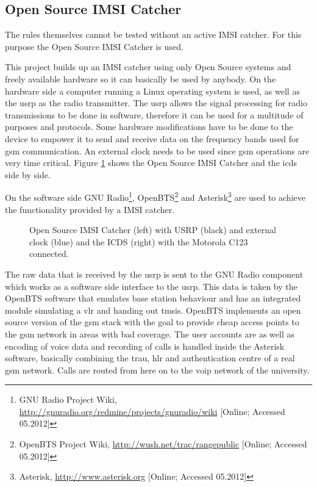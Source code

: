 \subsection{Open Source IMSI Catcher}
The rules themselves cannot be tested without an active IMSI catcher.
For this purpose the Open Source IMSI Catcher \cite{dennis} is used.

This project builds up an IMSI catcher using only Open Source systems and freely available hardware so it can basically be used by anybody.
On the hardware side a computer running a Linux operating system is used, as well as the \gls{usrp} as the radio transmitter.
The \gls{usrp} allows the signal processing for radio transmissions to be done in software, therefore it can be used for a multitude of purposes and protocols.
Some hardware modifications have to be done to the device to empower it to send and receive data on the frequency bands used for \gls{gsm} communication.
An external clock needs to be used since \gls{gsm} operations are very time critical.
Figure \ref{fig:setup} shows the Open Source IMSI Catcher and the \gls{icds} side by side.

On the software side GNU Radio\footnote{GNU Radio Project Wiki, \url{http://gnuradio.org/redmine/projects/gnuradio/wiki} [Online; Accessed 05.2012]}, OpenBTS\footnote{OpenBTS Project Wiki, \url{http://wush.net/trac/rangepublic} [Online; Accessed 05.2012]} and Asterisk\footnote{Asterisk, \url{http://www.asterisk.org} [Online; Accessed 05.2012]} are used to achieve the functionality provided by a IMSI catcher.
\begin{figure}
\caption{Open Source IMSI Catcher (left) with USRP (black) and external clock (blue) and the ICDS (right) with the Motorola C123 connected.}
\label{fig:setup}
\end{figure}
The raw data that is received by the \gls{usrp} is sent to the GNU Radio component which works as a software side interface to the \gls{usrp}.
This data is taken by the OpenBTS software that emulates base station behaviour and has an integrated module simulating a \gls{vlr} and handing out \glspl{tmsi}.
OpenBTS implements an open source version of the \gls{gsm} stack with the goal to provide cheap access points to the \gls{gsm} network in areas with bad coverage.
The user accounts are as well as encoding of voice data and recording of calls is handled inside the Asterisk software, basically combining the \gls{trau}, \gls{hlr} and authentication centre of a real \gls{gsm} network.
Calls are routed from here on to the \gls{voip} network of the university.

